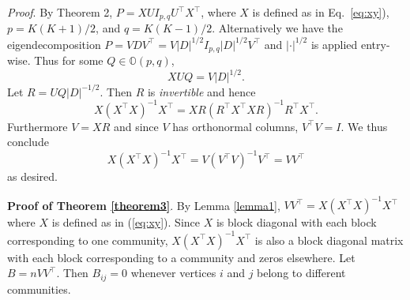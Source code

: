 \documentclass[12pt]{article}
\begin{document}
\emph{Proof}. By Theorem 2, \(P = X U I_{p, q} U^\top X^\top\), where
\(X\) is defined as in Eq.~\eqref{eq:xy}), $p = K(K+1)/2$, and $q = K(K-1)/2$. %
Alternatively we have the eigendecomposition \(P = V D V^\top = V
|D|^{1/2} I_{p, q} |D|^{1/2} V^\top\) and \(|\cdot|^{1/2}\) is applied entry-wise. Thus for some
\(Q \in \mathbb{O}(p, q)\),
\[X U Q = V |D|^{1/2}.\]
Let $R = U Q |D|^{-1/2}$. Then $R$ is {\em invertible} and hence
$$X (X^{\top} X)^{-1} X^{\top} = X R (R^{\top} X^{\top} X R)^{-1}
R^{\top} X^{\top}.$$ 
Furthermore $V = XR$ and since $V$ has orthonormal columns, $V^{\top}
V = I$. We thus conclude
$$X (X^{\top} X)^{-1} X^{\top} = V (V^{\top} V)^{-1} V^{\top} = V V^{\top}$$
as desired.

\textbf{Proof of Theorem \ref{theorem3}}. By Lemma \ref{lemma1},
\(V V^\top = X (X^\top X)^{-1} X^\top\) where \(X\) is defined as in
(\ref{eq:xy}). Since \(X\) is block diagonal with each block
corresponding to one community, \(X (X^\top X)^{-1} X^\top\) is also a
block diagonal matrix with each block corresponding to a community and
zeros elsewhere. Let $B = n VV^{\top}$. Then $B_{ij} = 0$ whenever
vertices $i$ and $j$ belong to different communities.  
%
\end{document}
